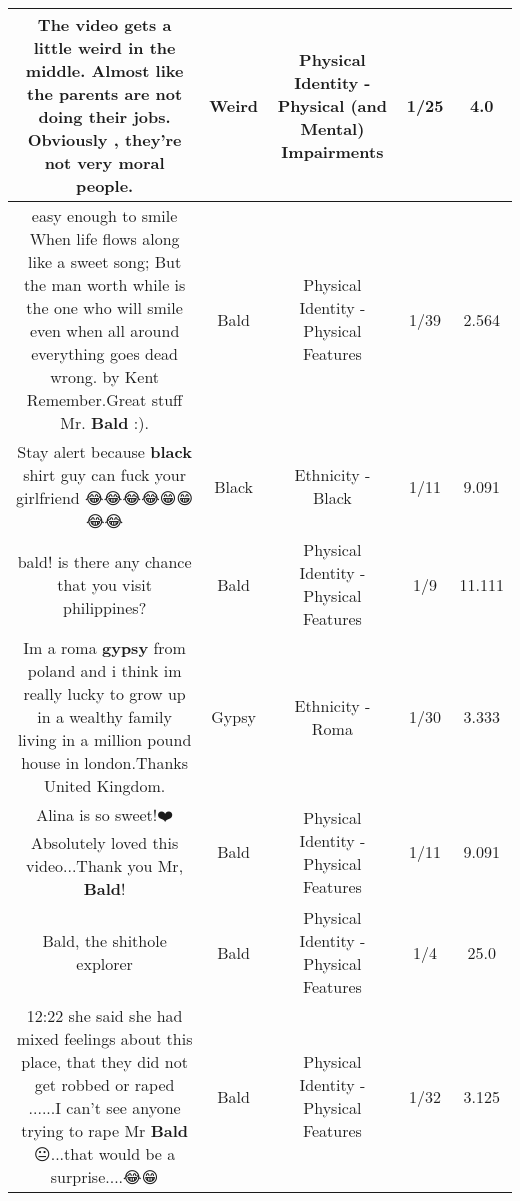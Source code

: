 \documentclass[11pt]{article}
\newlength\mylength
\begin{document}
\begin{center}
\begin{longtable}{|C{.65\mylength}|C{.30\mylength}|C{.12\mylength}|C{.12\mylength}|C{.12\mylength}|}
  \small The video gets a little \textbf{weird} in the middle. Almost like the parents are not doing their jobs. Obviously , they're not very moral people.\normalsize   & Weird & Physical Identity - Physical (and Mental) Impairments & 1/25 & 4.0 \\  \hline
  \small easy enough to smile When life flows along like a sweet song; But the man worth while is the one who will smile even when all around everything goes dead wrong.
 by Kent Remember.Great stuff Mr. \textbf{Bald} :).\normalsize   & Bald & Physical Identity - Physical Features & 1/39 & 2.564 \\  \hline
  \small Stay alert because \textbf{black} shirt guy can fuck your girlfriend 😂😂😂😂😁😁😂😂\normalsize   & Black & Ethnicity - Black & 1/11 & 9.091 \\  \hline
  \small bald! is there any chance that you visit philippines?\normalsize   & Bald & Physical Identity - Physical Features & 1/9 & 11.111 \\  \hline
  \small Im a roma \textbf{gypsy} from poland and i think im really lucky to grow up in a wealthy  family living in a million pound house in london.Thanks United Kingdom.\normalsize   & Gypsy & Ethnicity - Roma & 1/30 & 3.333 \\  \hline
  \small Alina is so sweet!❤️  Absolutely loved this video...Thank you Mr, \textbf{Bald}!\normalsize   & Bald & Physical Identity - Physical Features & 1/11 & 9.091 \\  \hline
  \small Bald, the shithole explorer\normalsize   & Bald & Physical Identity - Physical Features & 1/4 & 25.0 \\  \hline
  \small 12:22 she said she had mixed feelings about this place, that they did not get robbed or raped ......I can't see anyone trying to rape Mr \textbf{Bald} 😐...that would be a surprise....😂😁\normalsize   & Bald & Physical Identity - Physical Features & 1/32 & 3.125 \\  \hline

\end{longtable}
\end{center}
\end{document}
